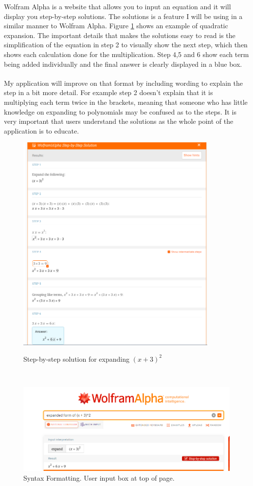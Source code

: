 \documentclass[final]{cmpreport}
\begin{document}
	Wolfram Alpha \cite{wolfram} is a website that allows you to input an equation and it will display you step-by-step solutions. The solutions is a feature I will be using in a similar manner to Wolfram Alpha. Figure \ref{fig:step} shows an example of quadratic expansion. The important details that makes the solutions easy to read is the simplification of the equation in step 2 to visually show the next step, which then shows each calculation done for the multiplication. Step 4,5 and 6 show each term being added individually and the final answer is clearly displayed in a blue box. \\
	\\My application will improve on that format by including wording to explain the step in a bit more detail. For example step 2 doesn't explain that it is multiplying each term twice in the brackets, meaning that someone who has little knowledge on expanding to polynomials may be confused as to the steps. It is very important that users understand the solutions as the whole point of the application is to educate.
	\begin{figure}[h!]
		\caption{Step-by-step solution for expanding $(x+3)^2$}
		\centering
		\includegraphics[height=110mm]{step.png}
		\label{fig:step}
	\end{figure}\\
	\begin{figure}[h!]
		\caption{Syntax Formatting. User input box at top of page.}
		\centering
		\includegraphics[scale=0.3]{step2.png}
	\end{figure}\\
\end{document}
